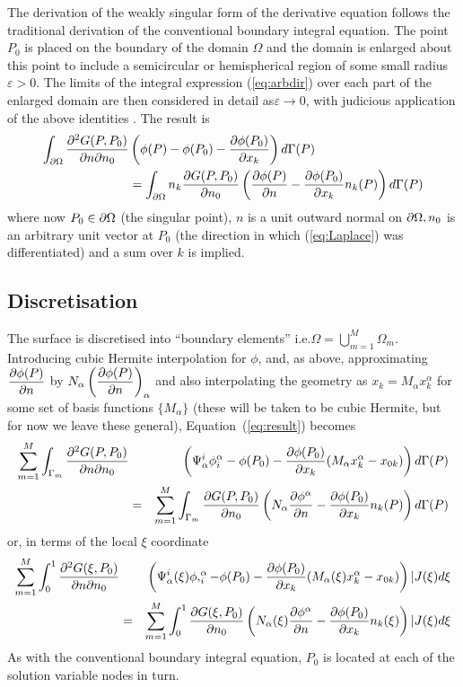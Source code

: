 The derivation of the weakly singular form of the derivative equation follows
the traditional derivation of the conventional boundary integral equation.
The point $P_{0}$ is placed on the boundary of the domain $\Omega$ and the
domain is enlarged about this point to include a semicircular or hemispherical
region of some small radius $\varepsilon > 0$.  The limits of the integral
expression (\ref{eq:arbdir}) over each part of the enlarged domain are then
considered in detail as$\varepsilon \rightarrow 0$, with judicious application
of the above identities \cite{tomlinson:1996,liu:1991}.  The result is
\begin{eqnarray}
 \int_{\partial\Omega}\frac{\partial^{2}G(P,P_{0})}{\partial n\partial n_{0}}
  &\left(\phi(P)-\phi(P_{0})- \dfrac{\partial \phi(P_{0})}{\partial x_{k}} \right)
  d\Gamma(P)\nonumber\\
  &=\int_{\partial\Omega} n_{k} \dfrac{\partial G(P,P_{0})}{\partial n_{0}} \left(
   \dfrac{\partial \phi(P)}{\partial n} - \dfrac{\partial \phi(P_{0})}{\partial x_{k}} n_{k}(P)\right)
  d\Gamma(P)
 \label{eq:result}
\end{eqnarray}
where now $P_{0}\in \partial\Omega$ (the singular point), $n$ is a unit outward
normal on $\partial\Omega, n_{0}$ is an arbitrary unit vector at $P_{0}$ (the
direction in which (\ref{eq:Laplace}) was differentiated) and a sum over $k$
is implied.

\subsection{Discretisation}
The surface is discretised into ``boundary elements'' i.e.$\Omega =
\displaystyle{\bigcup_{m=1}^{M}}\Omega_{m}$.  Introducing cubic Hermite
interpolation for $\phi $, and, as above, approximating $ \dfrac{\partial \phi(P)}{\partial n} $
by $N_{\alpha}\left( \dfrac{\partial \phi(P)}{\partial n} \right)_{\alpha}$ and also interpolating
the geometry as $x_{k} = M_{\alpha} x_{k}^{\alpha}$ for some set of basis
functions $\{M_{\alpha}\}$ (these will be taken to be cubic Hermite, but for
now we leave these general), Equation~(\ref{eq:result}) becomes
\begin{eqnarray}
  \sum_{m=1}^{M}\int_{\Gamma_{m}}\frac{\partial^{2}G(P,P_{0})} {\partial n\partial n_{0}}
  &&\left(\Psi_{\alpha}^{i}\phi_{i}^{\alpha}-\phi(P_{0})
    - \dfrac{\partial \phi(P_{0})}{\partial x_{k}} (M_{\alpha}x_{k}^{\alpha} - x_{0k})
  \right)d\Gamma(P)\nonumber\\ 
  &=&\sum_{m=1}^{M}\int_{\Gamma_{m}} \dfrac{\partial G(P,P_{0})}{\partial n_{0}} \left(
    N_{\alpha} \dfrac{\partial \phi^{\alpha}}{\partial n} - \dfrac{\partial \phi(P_{0})}{\partial x_{k}} 
    n_{k}(P)\right)d\Gamma(P)
 \label{eq:result2}
\end{eqnarray}
or, in terms of the local $\xi$ coordinate
\begin{eqnarray}
 \sum_{m=1}^{M}\int_{0}^{1}\frac{\partial^{2}G(\xi,P_{0})}
  {\partial n\partial n_{0}}
  &&\left(\Psi_{\alpha}^{i}(\xi)\phi,_{i}^{\alpha}-\phi(P_{0})
  - \dfrac{\partial \phi(P_{0})}{\partial x_{k}} (M_{\alpha}(\xi)x_{k}^{\alpha} - x_{0k})
  \right)|J(\xi)d\xi\nonumber\\
 &=&\sum_{m=1}^{M}\int_{0}^{1} \dfrac{\partial G(\xi,P_{0})}{\partial n_{0}} \left(
  N_{\alpha}(\xi) \dfrac{\partial \phi^{\alpha}}{\partial n} 
  - \dfrac{\partial \phi(P_{0})}{\partial x_{k}} n_{k}(\xi)
  \right)|J(\xi)d\xi
 \label{eq:result3}
\end{eqnarray}
As with the conventional boundary integral equation, $P_{0}$ is located at
each of the solution variable nodes in turn.

